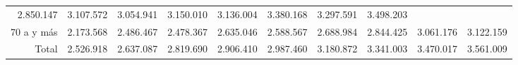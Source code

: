 \begin{tabular}{llllllllll}
  \multicolumn{1}{r}{2.850.147} &
  \multicolumn{1}{r}{3.107.572} &
  \multicolumn{1}{r}{3.054.941} &
  \multicolumn{1}{r}{3.150.010} &
  \multicolumn{1}{r}{3.136.004} &
  \multicolumn{1}{r}{3.380.168} &
  \multicolumn{1}{r}{3.297.591} &
  \multicolumn{1}{r}{3.498.203} \\
\multicolumn{1}{r}{70 a y más\hspace{1em}} &
  \multicolumn{1}{|r}{2.173.568} &
  \multicolumn{1}{r}{2.486.467} &
  \multicolumn{1}{r}{2.478.367} &
  \multicolumn{1}{r}{2.635.046} &
  \multicolumn{1}{r}{2.588.567} &
  \multicolumn{1}{r}{2.688.984} &
  \multicolumn{1}{r}{2.844.425} &
  \multicolumn{1}{r}{3.061.176} &
  \multicolumn{1}{r}{3.122.159} \\
\multicolumn{1}{r}{Total\hspace{1em}} &
  \multicolumn{1}{|r}{2.526.918} &
  \multicolumn{1}{r}{2.637.087} &
  \multicolumn{1}{r}{2.819.690} &
  \multicolumn{1}{r}{2.906.410} &
  \multicolumn{1}{r}{2.987.460} &
  \multicolumn{1}{r}{3.180.872} &
  \multicolumn{1}{r}{3.341.003} &
  \multicolumn{1}{r}{3.470.017} &
  \multicolumn{1}{r}{3.561.009} \\
\cline{1-10}
\end{tabular}
